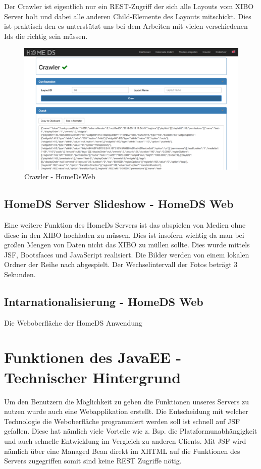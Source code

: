 Der Crawler ist eigentlich nur ein REST-Zugriff der sich alle Layouts vom XIBO Server holt und dabei alle anderen Child-Elemente des Layouts mitschickt. Dies ist praktisch den es unterstützt uns bei dem Arbeiten mit vielen verschiedenen Ids die richtig sein müssen.

\begin{figure}[h]
\centering
\includegraphics[width=1\textwidth]{images/08_HomeDsWeb/Crawler.png}
\caption{Crawler - HomeDsWeb}
\label{img:crawler}
\end{figure}

\subsection{HomeDS Server Slideshow - HomeDS Web}\label{sec:homedsslideshow}
Eine weitere Funktion des HomeDs Servers ist das abspielen von Medien ohne diese in den XIBO hochladen zu müssen. Dies ist insofern wichtig da man bei großen Mengen von Daten nicht das XIBO zu müllen sollte. Dies wurde mittels JSF, Bootsfaces und JavaScript realisiert. Die Bilder werden von einem lokalen Ordner der Reihe nach abgespielt. Der Wechselintervall der Fotos beträgt 3 Sekunden.

\subsection{Intarnationalisierung - HomeDS Web}\label{sec:homedsslideshow}
Die Weboberfläche der HomeDS Anwendung

\section{Funktionen des JavaEE - Technischer Hintergrund}
Um den Benutzern die Möglichkeit zu geben die Funktionen unseres Servers zu nutzen wurde auch eine Webapplikation erstellt. Die Entscheidung mit welcher Technologie die Weboberfläche programmiert werden soll ist schnell auf JSF gefallen. Diese hat nämlich viele Vorteile wie z. Bsp. die Platzformunabhängigkeit und auch schnelle Entwicklung im Vergleich zu anderen Clients. Mit JSF wird nämlich über eine Managed Bean direkt im XHTML auf die Funktionen des Servers zugegriffen somit sind keine REST Zugriffe nötig.

